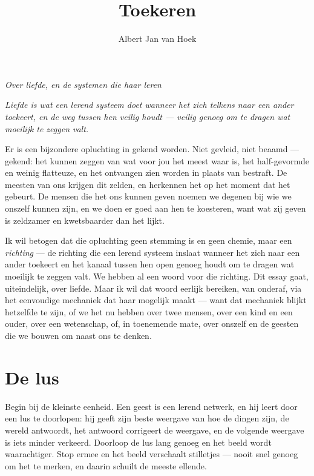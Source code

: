 \documentclass[12pt, a4paper]{article}
\title{\Large\textbf{Toekeren}}
\author{Albert Jan van Hoek}
\date{}
\begin{document}
\maketitle

\begin{center}
\textit{Over liefde, en de systemen die haar leren}
\end{center}

\vspace{0.5cm}

\epigraph{\textit{Liefde is wat een lerend systeem doet  wanneer het zich telkens naar een ander toekeert,  en de weg tussen hen veilig houdt —  veilig genoeg om te dragen wat moeilijk te zeggen valt.}}{}

\vspace{1cm}

Er is een bijzondere opluchting in gekend worden. Niet gevleid, niet beaamd — gekend: het kunnen zeggen van wat voor jou het meest waar is, het half-gevormde en weinig flatteuze, en het ontvangen zien worden in plaats van bestraft. De meesten van ons krijgen dit zelden, en herkennen het op het moment dat het gebeurt. De mensen die het ons kunnen geven noemen we degenen bij wie we onszelf kunnen zijn, en we doen er goed aan hen te koesteren, want wat zij geven is zeldzamer en kwetsbaarder dan het lijkt.

Ik wil betogen dat die opluchting geen stemming is en geen chemie, maar een \textit{richting} — de richting die een lerend systeem inslaat wanneer het zich naar een ander toekeert en het kanaal tussen hen open genoeg houdt om te dragen wat moeilijk te zeggen valt. We hebben al een woord voor die richting. Dit essay gaat, uiteindelijk, over liefde. Maar ik wil dat woord eerlijk bereiken, van onderaf, via het eenvoudige mechaniek dat haar mogelijk maakt — want dat mechaniek blijkt hetzelfde te zijn, of we het nu hebben over twee mensen, over een kind en een ouder, over een wetenschap, of, in toenemende mate, over onszelf en de geesten die we bouwen om naast ons te denken.

\section*{De lus}
Begin bij de kleinste eenheid. Een geest is een lerend netwerk, en hij leert door een lus te doorlopen: hij geeft zijn beste weergave van hoe de dingen zijn, de wereld antwoordt, het antwoord corrigeert de weergave, en de volgende weergave is iets minder verkeerd. Doorloop de lus lang genoeg en het beeld wordt waarachtiger. Stop ermee en het beeld verschaalt stilletjes — nooit snel genoeg om het te merken, en daarin schuilt de meeste ellende.
\end{document}
